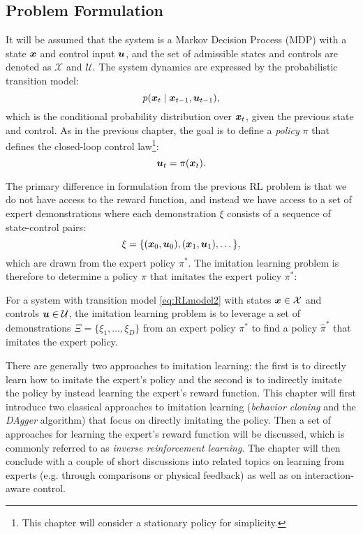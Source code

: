 \subsection{Problem Formulation}
It will be assumed that the system is a Markov Decision Process (MDP) with a state $\bm{x}$ and control input $\bm{u}$, and the set of admissible states and controls are denoted as $\mathcal{X}$ and $\mathcal{U}$. The system dynamics are expressed by the probabilistic transition model:
\begin{equation} \label{eq:RLmodel2}
p(\bm{x}_t \mid \bm{x}_{t-1}, \bm{u}_{t-1}),
\end{equation}
which is the conditional probability distribution over $\bm{x}_t$, given the previous state and control. As in the previous chapter, the goal is to define a \textit{policy} $\pi$ that defines the closed-loop control law\footnote{This chapter will consider a stationary policy for simplicity.}:
\begin{equation}
\bm{u}_t = \pi(\bm{x}_t).
\end{equation}

The primary difference in formulation from the previous RL problem is that we do not have access to the reward function, and instead we have access to a set of expert demonstrations where each demonstration $\xi$ consists of a sequence of state-control pairs:
\begin{equation} \label{eq:expert}
\xi = \{(\bm{x}_0, \bm{u}_0), (\bm{x}_1, \bm{u}_1), \dots\},
\end{equation}
which are drawn from the expert policy $\pi^*$.
The imitation learning problem is therefore to determine a policy $\pi$ that imitates the expert policy $\pi^*$:
\begin{definition}
For a system with transition model \eqref{eq:RLmodel2} with states $\bm{x} \in \mathcal{X}$ and controls $\bm{u} \in \mathcal{U}$, the imitation learning problem is to leverage a set of demonstrations $\Xi = \{\xi_1, \dots, \xi_D \}$ from an expert policy $\pi^*$ to find a policy $\hat{\pi}^*$ that imitates the expert policy.
\end{definition}

There are generally two approaches to imitation learning: the first is to directly learn how to imitate the expert's policy and the second is to indirectly imitate the policy by instead learning the expert's reward function.
This chapter will first introduce two classical approaches to imitation learning (\textit{behavior cloning} and the \textit{DAgger} algorithm) that focus on directly imitating the policy. Then a set of approaches for learning the expert's reward function will be discussed, which is commonly referred to as \textit{inverse reinforcement learning}. The chapter will then conclude with a couple of short discussions into related topics on learning from experts (e.g. through comparisons or physical feedback) as well as on interaction-aware control.

